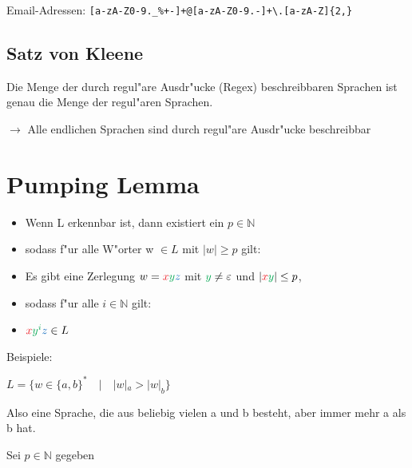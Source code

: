\documentclass[11pt, a4paper]{scrartcl}
\newcommand{\gr}[1]{{\color{Green}#1}}
\newcommand{\bl}[1]{{\color{RoyalBlue}#1}}
\newcommand{\rd}[1]{{\color{Red}#1}}
\begin{document}
Email-Adressen: \verb|[a-zA-Z0-9._%+-]+@[a-zA-Z0-9.-]+\.[a-zA-Z]{2,}|




\subsection{Satz von Kleene}

Die Menge der durch regul"are Ausdr"ucke (Regex) beschreibbaren Sprachen ist genau die Menge der regul"aren Sprachen.

\vspace{0.5em}

$\rightarrow$ Alle endlichen Sprachen sind durch regul"are Ausdr"ucke beschreibbar

\newpage


\section{Pumping Lemma}


\begin{itemize}
    \item Wenn L erkennbar ist, dann existiert ein $p \in \mathbb{N}$
    \item sodass f"ur alle W"orter w $\in L$ mit $|w| \geq p$ gilt:
    \item Es gibt eine Zerlegung $w = \rd{x}\gr{y}\bl{z}$ mit $\gr{y} \neq \varepsilon$ und $|\rd{x}\gr{y}| \leq p$,
    \item sodass f"ur alle $i \in \mathbb{N}$ gilt:
    \item $\rd{x}\gr{y^i}\bl{z} \in L$
\end{itemize}

\vspace{2em}

Beispiele:

\vspace{2em}

$L = \{ w \in \{a, b\}^* \quad | \quad |w|_a > |w|_b\}$ 

\vspace{0.5em}

Also eine Sprache, die aus beliebig vielen a und b besteht, aber immer mehr a als b hat.

\vspace{1.5em}

Sei $p \in \mathbb{N}$ gegeben
\end{document}
